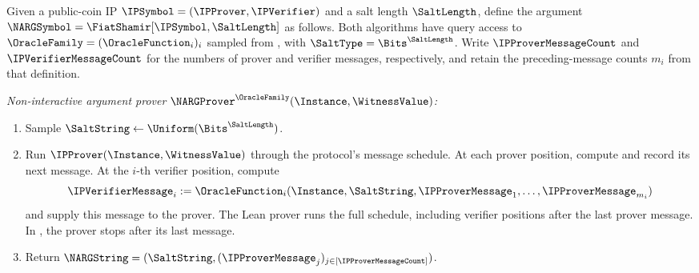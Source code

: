 \begin{construction}
\label{constr:basic_fiat_shamir}
Given a public-coin IP \(\IPSymbol=(\IPProver,\IPVerifier)\) and a salt length \(\SaltLength\), define the argument \(\NARGSymbol=\FiatShamir[\IPSymbol,\SaltLength]\) as follows. Both algorithms have query access to \(\OracleFamily=(\OracleFunction_i)_i\) sampled from , with \(\SaltType=\Bits^{\SaltLength}\). Write \(\IPProverMessageCount\) and \(\IPVerifierMessageCount\) for the numbers of prover and verifier messages, respectively, and retain the preceding-message counts \(m_i\) from that definition.

\emph{Non-interactive argument prover \(\NARGProver^{\OracleFamily}(\Instance,\WitnessValue)\):}
\begin{enumerate}
\item Sample \(\SaltString\leftarrow\Uniform(\Bits^{\SaltLength})\).
\item Run \(\IPProver(\Instance,\WitnessValue)\) through the protocol's message schedule. At each prover position, compute and record its next message. At the \(i\)-th verifier position, compute
\begin{equation*}
  \IPVerifierMessage_i:=\OracleFunction_i(\Instance,\SaltString,
    \IPProverMessage_1,\ldots,\IPProverMessage_{m_i})
\end{equation*}
and supply this message to the prover. The Lean prover runs the full schedule,
including verifier positions after the last prover message. In
\cite[Construction~3.17]{CO25}, the prover stops after its last message.
\item Return \(\NARGString=(\SaltString,(\IPProverMessage_j)_{j\in[\IPProverMessageCount]})\).
\end{enumerate}


\end{construction}

